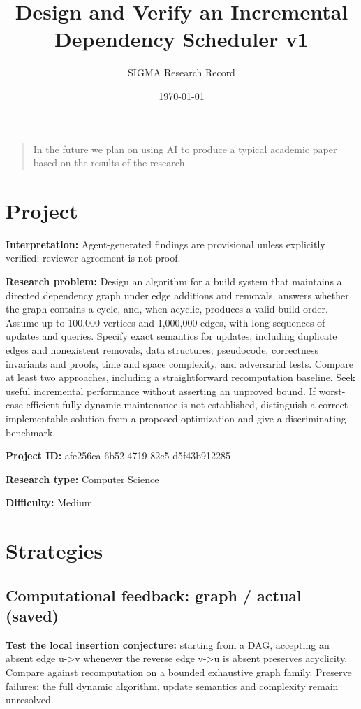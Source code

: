 \documentclass[11pt]{article}
\title{Design and Verify an Incremental Dependency Scheduler v1}
\author{SIGMA Research Record}
\date{\today}
\begin{document}
\maketitle
\begin{quote}\small In the future we plan on using AI to produce a typical academic paper based on the results of the research.\end{quote}
\section{Project}
\textbf{Interpretation:} Agent-generated findings are provisional unless explicitly verified; reviewer agreement is not proof.\par
\textbf{Research problem:} Design an algorithm for a build system that maintains a directed dependency graph under edge additions and removals, answers whether the graph contains a cycle, and, when acyclic, produces a valid build order. Assume up to 100,000 vertices and 1,000,000 edges, with long sequences of updates and queries. Specify exact semantics for updates, including duplicate edges and nonexistent removals, data structures, pseudocode, correctness invariants and proofs, time and space complexity, and adversarial tests. Compare at least two approaches, including a straightforward recomputation baseline. Seek useful incremental performance without asserting an unproved bound. If worst-case efficient fully dynamic maintenance is not established, distinguish a correct implementable solution from a proposed optimization and give a discriminating benchmark.\par
\textbf{Project ID:} afe256ca-6b52-4719-82c5-d5f43b912285\par
\textbf{Research type:} Computer Science\par
\textbf{Difficulty:} Medium\par
\section{Strategies}
\subsection{Computational feedback: graph / actual (saved)}
\textbf{Test the local insertion conjecture:} starting from a DAG, accepting an absent edge u-\textgreater{}v whenever the reverse edge v-\textgreater{}u is absent preserves acyclicity. Compare against recomputation on a bounded exhaustive graph family. Preserve failures; the full dynamic algorithm, update semantics and complexity remain unresolved.\par
\end{document}
